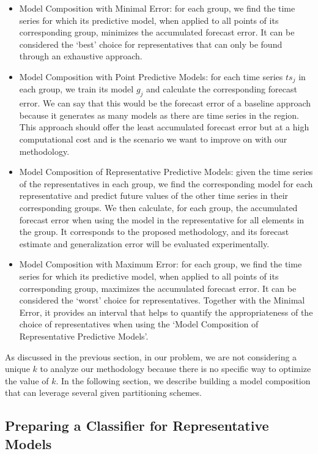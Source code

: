 \begin{itemize}%
	\item Model Composition with Minimal Error: for each group, we find the time series for which its predictive model, when applied to all points of its corresponding group, minimizes the accumulated forecast error. It can be considered the `best' choice for representatives that can only be found through an exhaustive approach.
	\item Model Composition with Point Predictive Models: for each time series $ts_j$ in each group, we train its model $g_j$ and calculate the corresponding forecast error. We can say that this would be the forecast error of a baseline approach because it generates as many models as there are time series in the region. This approach should offer the least accumulated forecast error but at a high computational cost and is the scenario we want to improve on with our methodology.
	\item Model Composition of Representative Predictive Models: given the time series of the representatives in each group, we find the corresponding model for each representative and predict future values of the other time series in their corresponding groups. We then calculate, for each group, the accumulated forecast error when using the model in the representative for all elements in the group. It corresponds to the proposed methodology, and its forecast estimate and generalization error will be evaluated experimentally.
	\item Model Composition with Maximum Error: for each group, we find the time series for which its predictive model, when applied to all points of its corresponding group, maximizes the accumulated forecast error. It can be considered the `worst' choice for representatives. Together with the Minimal Error, it provides an interval that helps to quantify the appropriateness of the choice of representatives when using the `Model Composition of Representative Predictive Models'.
\end{itemize}

As discussed in the previous section, in our problem, we are not considering a unique $k$ to analyze our methodology because there is no specific way to optimize the value of $k$. In the following section, we describe building a model composition that can leverage several given partitioning schemes.

\subsection{Preparing a Classifier for Representative Models}
\label{Sec:Classifier}

